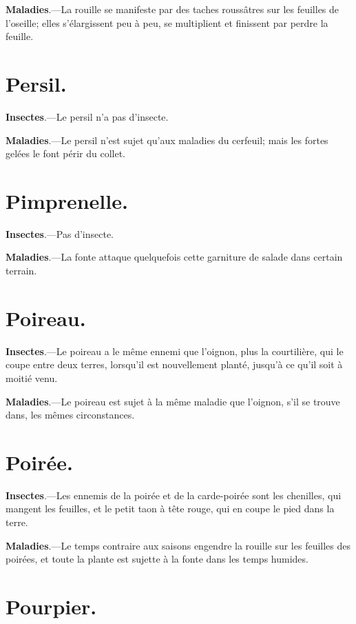 \documentclass[10pt,a4paper]{book}
\begin{document}
\textbf{Maladies}.---La rouille se manifeste par des taches roussâtres sur les feuilles de l'oseille; elles s'élargissent peu à peu, se multiplient et finissent par perdre la feuille.

\section{Persil.}

\textbf{Insectes}.---Le persil n'a pas d'insecte.

\textbf{Maladies}.---Le persil n'est sujet qu'aux maladies du cerfeuil; mais les fortes gelées le font périr du collet.

\section{Pimprenelle.}

\textbf{Insectes}.---Pas d'insecte.

\textbf{Maladies}.---La fonte attaque quelquefois cette garniture de salade dans certain terrain.

\section{Poireau.}

\textbf{Insectes}.---Le poireau a le même ennemi que l'oignon, plus la courtilière, qui le coupe entre deux terres, lorsqu'il est nouvellement planté, jusqu'à ce qu'il soit à moitié venu.

\textbf{Maladies}.---Le poireau est sujet à la même maladie que l'oignon, s'il se trouve dans, les mêmes circonstances.

\section{Poirée.}

\textbf{Insectes}.---Les ennemis de la poirée et de la carde-poirée sont les chenilles, qui mangent les feuilles, et le petit taon à tête rouge, qui en coupe le pied dans la terre.

\textbf{Maladies}.---Le temps contraire aux saisons engendre la rouille sur les feuilles des poirées, et toute la plante est sujette à la fonte dans les temps humides.

\section{Pourpier.}
\end{document}
